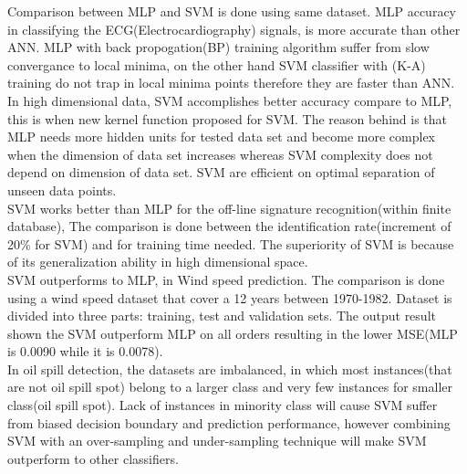 

	Comparison between MLP and SVM is done using same dataset. MLP accuracy in classifying the ECG(Electrocardiography) signals, is more accurate than other ANN. MLP with back propogation(BP) training algorithm suffer from slow convergance to local minima, on the other hand SVM classifier with (K-A) training do not trap in local minima points therefore they are faster than ANN\cite{Moavenian20103088}.\\
	In high dimensional data, SVM accomplishes better accuracy compare to MLP, this is when new kernel function proposed for SVM. The reason behind is that MLP needs more hidden units for tested data set and become more complex when the dimension of data set increases whereas SVM complexity does not depend on dimension of data set. SVM are efficient on optimal separation of unseen data points\cite{Zanaty2012177}.\\
	SVM works better than MLP for the off-line signature recognition(within finite database), The comparison is done between the identification rate(increment of 20\% for SVM) and for training time needed. The superiority of SVM is because of its generalization ability in high dimensional space\cite{FriasMartinez2006693}.\\
	SVM outperforms to MLP, in Wind speed prediction. The comparison is done using a wind speed dataset that cover a 12 years between 1970-1982. Dataset is divided into three parts: training, test and validation sets. The output result shown the SVM outperform MLP on all orders resulting in the lower MSE(MLP is 0.0090 while it is 0.0078)\cite{Mohandes2004939}.\\
	In oil spill detection, the datasets are imbalanced, in which most instances(that are not oil spill spot) belong to a larger class and very few instances for smaller class(oil spill spot). Lack of instances in minority class will cause SVM suffer from biased decision boundary and prediction performance, however combining SVM with an over-sampling and under-sampling technique will make SVM outperform to other classifiers\cite{liu2006boosting}.

	
      




	